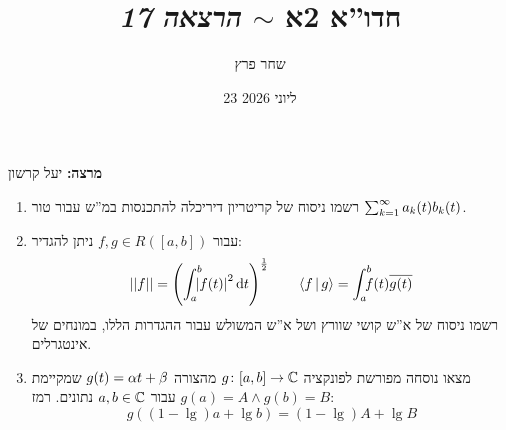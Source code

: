 \documentclass[]{../../../../tex/classes/styledArticle}
\author{שחר פרץ}
\title{חדו''א 2א $\sim$ \textit{הרצאה 17}}
\date{23 ליוני 2026}
\begin{document}
	\maketitle
	\textbf{מרצה: }יעל קרשון
	
	\begin{Exercise}[פתיחה]
		\begin{enumerate}
			\item רשמו ניסוח של קריטריון דיריכלה להתכנסות במ''ש עבור טור $\sum_{k = 1}^{\infty} a_k(t)b_k(t)$. 
			\item עבור $f, g \in R([a, b])$ ניתן להגדיר: 
			\[ \norm{f} = \cl{\int^{b}_a\dequad \ \sof{f(t)}^{2}\!\dt}^{\frac{1}{2}} \quad\quad \mut{f}{g} = \int^{b}_a \dequad\ f(t)\ol{g(t)} \]
			רשמו ניסוח של א''ש קושי שוורץ ושל א''ש המשולש עבור ההגדרות הללו, במונחים של אינטגרלים. 
			\item מצאו נוסחה מפורשת לפונקציה $g \colon [a, b] \to \mathbb{C}$ מהצורה $g(t) = \alpha t + \beta$ שמקיימת $g(a) = A \land g(b)= B$ עבור $a, b \in \mathbb{C}$ נתונים. רמז: 
			\[ g((1 - \lg)a + \lg b) = (1 - \lg)A  +\lg B \]
		\end{enumerate}
	\end{Exercise}
	
\end{document}
